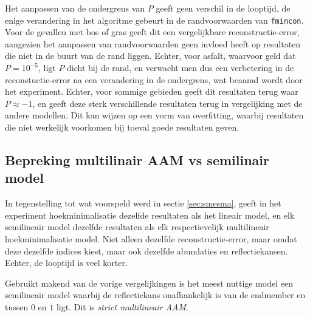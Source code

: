 \documentclass[12pt]{report}
\begin{document}
Het aanpassen van de ondergrens van $P$ geeft geen verschil in de looptijd, de enige verandering in het algoritme gebeurt in de randvoorwaarden van \texttt{fmincon}. Voor de gevallen met bos of gras geeft dit een vergelijkbare reconstructie-error, aangezien het aanpassen van randvoorwaarden geen invloed heeft op resultaten die niet in de buurt van de rand liggen. Echter, voor asfalt, waarvoor geld dat $P=10^{-5}$, ligt $P$ dicht bij de rand, en verwacht men dus een verbetering in de reconstuctie-error na een verandering in de ondergrens, wat beaamd wordt door het experiment. Echter, voor sommige gebieden geeft dit resultaten terug waar $P \approx -1$, en geeft deze sterk verschillende resultaten terug in vergelijking met de andere modellen. Dit kan wijzen op een vorm van overfitting, waarbij resultaten die niet werkelijk voorkomen bij toeval goede resultaten geven.

\subsection{Bepreking multilinair AAM vs semilinair model}

In tegenstelling tot wat voorspeld werd in sectie \ref{sec:smesma}, geeft in het experiment hoekminimalisatie dezelfde resultaten als het lineair model, en elk semilineair model dezelfde resultaten als elk respectievelijk multilineair hoekminimalisatie model. Niet alleen dezelfde reconstructie-error, maar omdat deze dezelfde indices kiest, maar ook dezelfde abundaties en reflectiekansen. Echter, de looptijd is veel korter. 

\vspace{5 mm}

Gebruikt makend van de vorige vergelijkingen is het meest nuttige model een semilineair model waarbij de reflectiekans onafhankelijk is van de endmember en tussen $0$ en $1$ ligt. Dit is \textit{strict multilineair AAM}.


\begin{flushleft}
\nocite{*}
{}


\end{flushleft}
\end{document}
